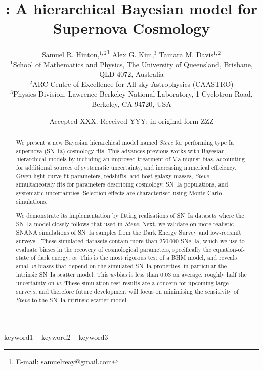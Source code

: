 \documentclass[a4paper,fleqn,usenatbib]{mnras}
\title[\name]{\name: A hierarchical Bayesian model for Supernova Cosmology}
\author[S. R. Hinton et al.]{
	Samuel R. Hinton,$^{1,2}$\thanks{E-mail: samuelreay@gmail.com}
	Alex G. Kim,$^{3}$
	Tamara M. Davis$^{1,2}$
	\\
	$^{1}$School of Mathematics and Physics, The University of Queensland, Brisbane, QLD 4072, Australia\\
	$^{2}$ARC Centre of Excellence for All-sky Astrophysics (CAASTRO)\\
	$^{3}$Physics Division, Lawrence Berkeley National Laboratory, 1 Cyclotron Road, Berkeley, CA 94720, USA
}
\date{Accepted XXX. Received YYY; in original form ZZZ}
\newcommand{\steve}{\textit{Steve}}
\begin{document}
\label{firstpage}
\pagerange{\pageref{firstpage}--\pageref{lastpage}}
\maketitle






\begin{abstract}
We present a new Bayesian hierarchical model named {\steve} for performing type Ia supernova (SN~Ia) cosmology fits. 
%
This advances previous works with Bayesian hierarchical models by including 
an improved treatment of Malmquist bias, 
accounting for additional sources of systematic uncertainty, 
and increasing numerical efficiency. 
%
Given light curve fit parameters, redshifts, and host-galaxy masses, {\steve} simultaneously fits for parameters describing cosmology, SN~Ia populations, and systematic uncertainties. Selection effects are characterised using Monte-Carlo simulations.


We demonstrate its implementation by fitting realisations of SN~Ia datasets where the SN~Ia model closely follows that used in {\steve}.
%
Next, we validate on more realistic SNANA simulations of SN~Ia samples from the Dark Energy Survey and low-redshift surveys \citep{DESKEY}.
%
These simulated datasets contain more than $250\,000$ SNe~Ia, which we use to evaluate biases in the recovery of cosmological parameters, specifically the equation-of-state of dark energy, $w$. 
%
This is the most rigorous test of a BHM model, and reveals small $w$-biases that depend on the simulated SN~Ia properties, in particular the intrinsic SN~Ia scatter model. This $w$-bias is less than $0.03$ on average, roughly half the uncertainty on $w$.
%
These simulation test results are a concern for upcoming large surveys, and therefore future development will focus on minimising the sensitivity of {\steve} to the SN~Ia intrinsic scatter model.
\end{abstract}

\begin{keywords}
keyword1 -- keyword2 -- keyword3
\end{keywords}
\end{document}
